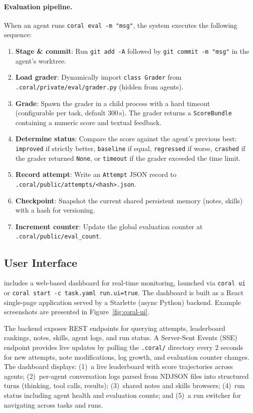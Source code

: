 \paragraph{Evaluation pipeline.} When an agent runs \texttt{coral eval -m "msg"}, the system executes the following sequence:
\begin{enumerate}[nosep,leftmargin=*]
    \item \textbf{Stage \& commit}: Run \texttt{git add -A} followed by \texttt{git commit -m "msg"} in the agent's worktree.
    \item \textbf{Load grader}: Dynamically import \texttt{class Grader} from \texttt{.coral/private/eval/grader.py} (hidden from agents).
    \item \textbf{Grade}: Spawn the grader in a child process with a hard timeout (configurable per task, default 300\,s). The grader returns a \texttt{ScoreBundle} containing a numeric score and textual feedback.
    \item \textbf{Determine status}: Compare the score against the agent's previous best: \texttt{improved} if strictly better, \texttt{baseline} if equal, \texttt{regressed} if worse, \texttt{crashed} if the grader returned \texttt{None}, or \texttt{timeout} if the grader exceeded the time limit.
    \item \textbf{Record attempt}: Write an \texttt{Attempt} JSON record to \texttt{.coral/\allowbreak public/\allowbreak attempts/\allowbreak <hash>.json}.
    \item \textbf{Checkpoint}: Snapshot the current shared persistent memory (notes, skills) with a hash for versioning.
    \item \textbf{Increment counter}: Update the global evaluation counter at \texttt{.coral/public/eval\_count}.
\end{enumerate}

\subsection{User Interface}
\label{app:ui}

\method{} includes a web-based dashboard for real-time monitoring, launched via \texttt{coral ui} or \texttt{coral start~-c~task.yaml~run.ui=true}. The dashboard is built as a React single-page application served by a Starlette (async Python) backend. Example screenshots are presented in Figure~\ref{fig:coral-ui}.

The backend exposes REST endpoints for querying attempts, leaderboard rankings, notes, skills, agent logs, and run status. A Server-Sent Events (SSE) endpoint provides live updates by polling the \texttt{.coral/} directory every 2 seconds for new attempts, note modifications, log growth, and evaluation counter changes. The dashboard displays: (1)~a live leaderboard with score trajectories across agents; (2)~per-agent conversation logs parsed from NDJSON files into structured turns (thinking, tool calls, results); (3)~shared notes and skills browsers; (4)~run status including agent health and evaluation counts; and (5)~a run switcher for navigating across tasks and runs.

